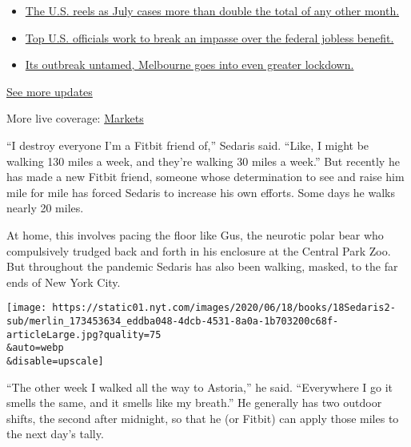 \begin{itemize}
\tightlist
\item
  \href{https://www.nytimes.com/2020/08/01/world/coronavirus-covid-19.html?action=click\&pgtype=Article\&state=default\&region=MAIN_CONTENT_1\&context=storylines_live_updates\#link-34047410}{The
  U.S. reels as July cases more than double the total of any other
  month.}
\item
  \href{https://www.nytimes.com/2020/08/01/world/coronavirus-covid-19.html?action=click\&pgtype=Article\&state=default\&region=MAIN_CONTENT_1\&context=storylines_live_updates\#link-780ec966}{Top
  U.S. officials work to break an impasse over the federal jobless
  benefit.}
\item
  \href{https://www.nytimes.com/2020/08/01/world/coronavirus-covid-19.html?action=click\&pgtype=Article\&state=default\&region=MAIN_CONTENT_1\&context=storylines_live_updates\#link-2bc8948}{Its
  outbreak untamed, Melbourne goes into even greater lockdown.}
\end{itemize}

\href{https://www.nytimes.com/2020/08/01/world/coronavirus-covid-19.html?action=click\&pgtype=Article\&state=default\&region=MAIN_CONTENT_1\&context=storylines_live_updates}{See
more updates}

More live coverage:
\href{https://www.nytimes.com/live/2020/07/31/business/stock-market-today-coronavirus?action=click\&pgtype=Article\&state=default\&region=MAIN_CONTENT_1\&context=storylines_live_updates}{Markets}

``I destroy everyone I'm a Fitbit friend of,'' Sedaris said. ``Like, I
might be walking 130 miles a week, and they're walking 30 miles a
week.'' But recently he has made a new Fitbit friend, someone whose
determination to see and raise him mile for mile has forced Sedaris to
increase his own efforts. Some days he walks nearly 20 miles.

At home, this involves pacing the floor like Gus, the neurotic polar
bear who compulsively trudged back and forth in his enclosure at the
Central Park Zoo. But throughout the pandemic Sedaris has also been
walking, masked, to the far ends of New York City.

\texttt{[image: https://static01.nyt.com/images/2020/06/18/books/18Sedaris2-sub/merlin\_173453634\_eddba048-4dcb-4531-8a0a-1b703200c68f-articleLarge.jpg?quality=75\\\&auto=webp\\\&disable=upscale]}

``The other week I walked all the way to Astoria,'' he said.
``Everywhere I go it smells the same, and it smells like my breath.'' He
generally has two outdoor shifts, the second after midnight, so that he
(or Fitbit) can apply those miles to the next day's tally.

